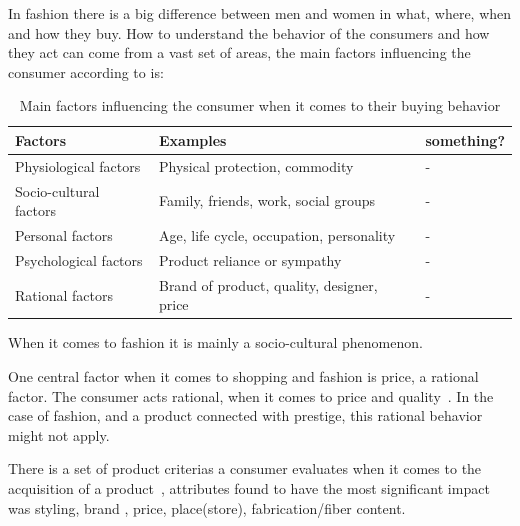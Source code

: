 
In fashion there is a big difference between men and women in what, where, when
and how they buy.  How to understand the behavior of the consumers and how they
act can come from a vast set of areas, the main factors influencing the consumer according to \cite{kotler2009marketing} is:

\begin{table}[H]
    \centering
    \begin{tabular}{l|l|l}
      \textbf{Factors}        & \textbf{Examples} & \textbf{something?} \\ \hline
      Physiological factors   & Physical protection, commodity & - \\ \hline
      Socio-cultural factors  & Family, friends, work, social groups & - \\ \hline
      Personal factors        & Age, life cycle, occupation, personality & - \\ \hline
      Psychological factors   & Product reliance or sympathy & - \\ \hline %
      Rational factors        & Brand of product, quality, designer, price & - \\
    \end{tabular}
    \label{table:FashionFactors}
    \caption [Fashion Factors]{Main factors influencing the consumer when it comes to their buying behavior}
\end{table}
When it comes to fashion it is mainly a socio-cultural phenomenon.

One central factor when it comes to shopping and fashion is price, a rational factor.
The consumer acts rational, when it comes to price and quality~\cite{Hanf1994}.
In the case of fashion, and a product connected with prestige, this rational behavior might not apply.

There is a set of product criterias a consumer evaluates when it comes to the acquisition of a product~\cite{dutton2006}, attributes found to have the most significant impact was styling, brand , price, place(store), fabrication/fiber content.


